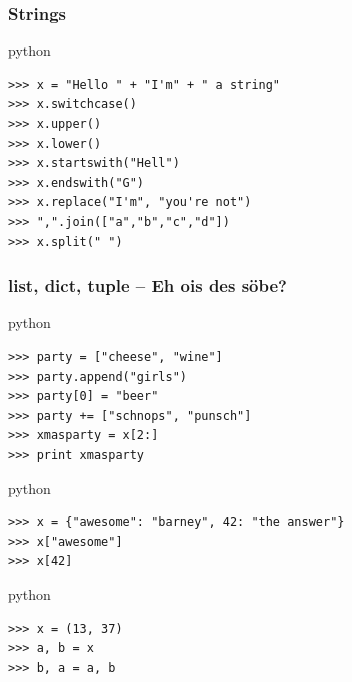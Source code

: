\documentclass{beamer}
\begin{document}
\begin{frame}[fragile]
	\frametitle{Strings}
	
	\begin{exampleblock}{python}
	\begin{lstlisting}
>>> x = "Hello " + "I'm" + " a string"
>>> x.switchcase()
>>> x.upper()
>>> x.lower()
>>> x.startswith("Hell")
>>> x.endswith("G")
>>> x.replace("I'm", "you're not")
>>> ",".join(["a","b","c","d"])
>>> x.split(" ")
	\end{lstlisting}
	\end{exampleblock}
\end{frame}


\begin{frame}[fragile]
	\frametitle{list, dict, tuple -- Eh ois des söbe?}
	
	\begin{exampleblock}{python}
	\begin{lstlisting}
>>> party = ["cheese", "wine"]
>>> party.append("girls")
>>> party[0] = "beer"
>>> party += ["schnops", "punsch"]
>>> xmasparty = x[2:]
>>> print xmasparty
	\end{lstlisting}
	\end{exampleblock}
	
\pause
	
	\begin{exampleblock}{python}
	\begin{lstlisting}
>>> x = {"awesome": "barney", 42: "the answer"}
>>> x["awesome"]
>>> x[42]
	\end{lstlisting}
	\end{exampleblock}

\pause

	\begin{exampleblock}{python}
	\begin{lstlisting}
>>> x = (13, 37)
>>> a, b = x
>>> b, a = a, b
	\end{lstlisting}
	\end{exampleblock}
\end{frame}
\end{document}
